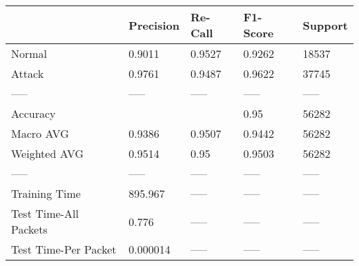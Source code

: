 \begin{tabular}{lllll}
\toprule
{} & Precision & Re-Call & F1-Score & Support \\
\midrule
Normal                &    0.9011 &  0.9527 &   0.9262 &   18537 \\
Attack                &    0.9761 &  0.9487 &   0.9622 &   37745 \\
-----                 &     ----- &   ----- &    ----- &   ----- \\
Accuracy              &           &         &     0.95 &   56282 \\
Macro AVG             &    0.9386 &  0.9507 &   0.9442 &   56282 \\
Weighted AVG          &    0.9514 &    0.95 &   0.9503 &   56282 \\
-----                 &     ----- &   ----- &    ----- &   ----- \\
Training Time         &   895.967 &   ----- &    ----- &   ----- \\
Test Time-All Packets &     0.776 &   ----- &    ----- &   ----- \\
Test Time-Per Packet  &  0.000014 &   ----- &    ----- &   ----- \\
\bottomrule
\end{tabular}
